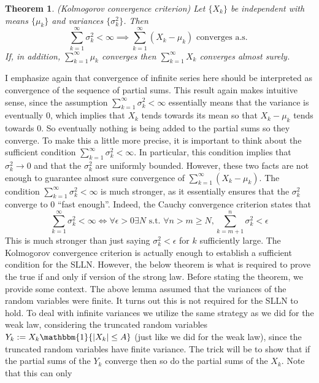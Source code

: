 \documentclass[12pt]{article}
\newcommand*{\abs}[1]{\left\lvert#1\right\rvert}
\newtheorem{thm}{Theorem}
\begin{document}
\begin{thm} \label{Kolmogorov_convergence_criterion}
(Kolmogorov convergence criterion) Let $\{X_k\}$ be independent with means $\{\mu_k\}$ and variances $\{\sigma_k^2\}$. Then 
\[\sum_{k = 1}^{\infty} \sigma_k^2 < \infty \implies \sum_{k = 1}^{\infty} (X_k - \mu_k) \text{ converges a.s. }\]
If, in addition, $\sum_{k = 1}^{\infty} \mu_k$ converges then $\sum_{k = 1}^{\infty} X_k$ converges almost surely. 
\end{thm}
I emphasize again that convergence of infinite series here should be interpreted as convergence of the sequence of partial sums. This result again makes intuitive sense, since the assumption 
$\sum_{k = 1}^{\infty} \sigma_k^2 < \infty$ essentially means that the variance is eventually $0$, which implies that $X_k$ tends towards its mean so that $X_k - \mu_k$ tends towards $0$. So eventually 
nothing is being added to the partial sums so they converge. To make this a little more precise, it is important to think about the sufficient condition $\sum_{k = 1}^{\infty} \sigma_k^2 < \infty$. In particular, 
this condition implies that $\sigma_k^2 \to 0$ and that the $\sigma_k^2$ are uniformly bounded. However, these two facts are not enough to guarantee almost sure convergence of $\sum_{k = 1}^{\infty} (X_k - \mu_k)$. 
The condition $\sum_{k = 1}^{\infty} \sigma_k^2 < \infty$ is much stronger, as it essentially ensures that the $\sigma_k^2$ converge to $0$ ``fast enough''. Indeed, the Cauchy convergence criterion states that 
\[\sum_{k = 1}^{\infty} \sigma_k^2 < \infty \iff \forall \epsilon > 0 \exists N \text{ s.t. } \forall n > m \geq N, \sum_{k = m + 1}^{n} \sigma_k^2 < \epsilon\]
This is much stronger than just saying $\sigma_k^2 < \epsilon$ for $k$ sufficiently large. The Kolmogorov convergence criterion is actually enough to establish a sufficient condition for the SLLN. However, the below theorem
is what is required to prove the true if and only if version of the strong law. Before stating the theorem, we provide some context. The above lemma assumed that the variances of the random variables were 
finite. It turns out this is not required for the SLLN to hold. To deal with infinite variances we utilize the same strategy as we did for the weak law, considering the truncated random variables
$Y_k := X_k \mathbbm{1}\{\abs{X_k} \leq A\}$ (just like we did for the weak law), since the truncated random variables have finite variance. 
The trick will be to show that if the partial sums of the $Y_k$ converge then so do the partial sums of the $X_k$. Note that this can only 
\end{document}
